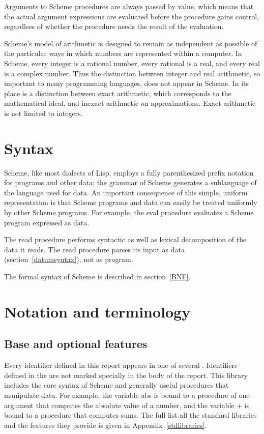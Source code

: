 \vest Arguments to Scheme procedures are always passed by value, which
means that the actual argument expressions are evaluated before the
procedure gains control, regardless of whether the procedure needs the
result of the evaluation.  

\vest Scheme's model of arithmetic is designed to remain as independent as
possible of the particular ways in which numbers are represented within a
computer. In Scheme, every integer is a rational number, every rational is a
real, and every real is a complex number.  Thus the distinction between integer
and real arithmetic, so important to many programming languages, does not
appear in Scheme.  In its place is a distinction between exact arithmetic,
which corresponds to the mathematical ideal, and inexact arithmetic on
approximations.  Exact arithmetic is not limited to integers.

\section{Syntax}

Scheme, like most dialects of Lisp, employs a fully parenthesized prefix
notation for programs and other data; the grammar of Scheme generates a
sublanguage of the language used for data.  An important
consequence of this simple, uniform representation is that
Scheme programs and data can easily be treated uniformly by other Scheme programs.
For example, the {\cf eval} procedure evaluates a Scheme program expressed
as data.

The {\cf read} procedure performs syntactic as well as lexical decomposition of
the data it reads.  The {\cf read} procedure parses its input as data
(section~\ref{datumsyntax}), not as program.

The formal syntax of Scheme is described in section~\ref{BNF}.


\section{Notation and terminology}


\subsection{Base and optional features}
\label{qualifiers}

Every identifier defined in this report appears in one of several
.  Identifiers defined in the 
are not marked specially in the body of the report.  
This library includes the core syntax of Scheme
and generally useful procedures that manipulate data.  For example, the
variable {\cf abs} is bound to a
procedure of one argument that computes the absolute value of a
number, and the variable {\cf +} is bound to a procedure that computes
sums.  The full list 
all the standard libraries and the features they provide is given in
Appendix~\ref{stdlibraries}.

